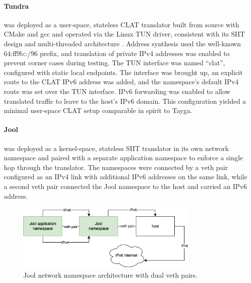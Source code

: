 \paragraph{Tundra} 
was deployed as a user‑space, stateless CLAT translator built from source with CMake and gcc and operated via the Linux TUN driver, consistent with its SIIT design and multi-threaded architecture \cite{rfc7915,labuda_tundra_nat64}. Address synthesis used the well-known 64:ff9b::/96 prefix, and translation of private IPv4 addresses was enabled to prevent corner cases during testing. The TUN interface was named “clat”, configured with static local endpoints. The interface was brought up, an explicit route to the CLAT IPv6 address was added, and the namespace’s default IPv4 route was set over the TUN interface. IPv6 forwarding was enabled to allow translated traffic to leave to the host’s IPv6 domain. This configuration yielded a minimal user-space CLAT setup comparable in spirit to Tayga\cite{labuda_tundra_nat64}.

\paragraph{Jool}
was deployed as a kernel-space, stateless SIIT translator in its own network namespace and paired with a separate application namespace to enforce a single hop through the translator. The namespaces were connected by a veth pair configured as an IPv4 link with additional IPv6 addresses on the same link, while a second veth pair connected the Jool namespace to the host and carried an IPv6 address. 

\begin{figure}[H]
    \centering
    \caption{Jool network namespace architecture with dual veth pairs.}
    \label{fig:jool_architecture}
    \includegraphics[width=0.8\textwidth]{resources/images/updatedjooldiagram.png}
\end{figure}

